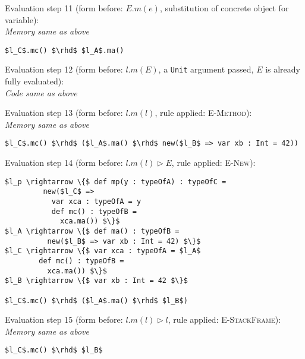 \documentclass{llncs}
\begin{document}
\vspace{12pt}
\noindent Evaluation step 11 (form before: $E.m(e)$, substitution of concrete object for variable):\\
\vspace{-6pt}
\indent\textit{Memory same as above}\\
\vspace{-6pt}
\begin{lstlisting}[xleftmargin=20pt]
$l_C$.mc() $\rhd$ $l_A$.ma()
\end{lstlisting}

\vspace{12pt}
\noindent Evaluation step 12 (form before: $l.m(E)$, a \lstinline{Unit} argument passed, $E$ is already fully evaluated):\\
\indent\textit{Code same as above}

\vspace{12pt}
\noindent Evaluation step 13 (form before: $l.m(l)$, rule applied: \textsc{E-Method}):\\
\vspace{-6pt}
\indent\textit{Memory same as above}\\
\vspace{-6pt}
\begin{lstlisting}[xleftmargin=20pt]
$l_C$.mc() $\rhd$ ($l_A$.ma() $\rhd$ new($l_B$ => var xb : Int = 42))
\end{lstlisting}

\vspace{12pt}
\noindent Evaluation step 14 (form before: $l.m(l) \rhd E$, rule applied: \textsc{E-New}):
\vspace{-6pt}
\begin{lstlisting}[xleftmargin=20pt]
$l_p \rightarrow \{$ def mp(y : typeOfA) : typeOfC =
         new($l_C$ =>
           var xca : typeOfA = y
           def mc() : typeOfB =
             xca.ma()) $\}$
$l_A \rightarrow \{$ def ma() : typeOfB =
          new($l_B$ => var xb : Int = 42) $\}$
$l_C \rightarrow \{$ var xca : typeOfA = $l_A$
        def mc() : typeOfB =
          xca.ma()) $\}$
$l_B \rightarrow \{$ var xb : Int = 42 $\}$

$l_C$.mc() $\rhd$ ($l_A$.ma() $\rhd$ $l_B$)
\end{lstlisting}

\vspace{12pt}
\noindent Evaluation step 15 (form before: $l.m(l) \rhd l$, rule applied: \textsc{E-StackFrame}):\\
\vspace{-6pt}
\indent\textit{Memory same as above}\\
\vspace{-6pt}
\begin{lstlisting}[xleftmargin=20pt]
$l_C$.mc() $\rhd$ $l_B$
\end{lstlisting}
\end{document}
